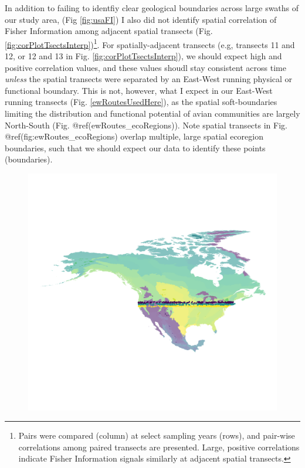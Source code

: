 \documentclass[12pt,twoside,openany]{reedthesis}
\begin{document}
In addition to failing to identfiy clear geological boundaries across large swaths of our study area, (Fig \ref{fig:usaFI}) I also did not identify spatial correlation of Fisher Information among adjacent spatial transects (Fig. \ref{fig:corPlotTsectsInterp})\footnote{Pairs were compared (column) at select sampling years (rows), and pair-wise correlations among paired transects are presented. Large, positive correlations indicate Fisher Information signals similarly at adjacent spatial transects.}. For spatially-adjacent transects (e.g, transects 11 and 12, or 12 and 13 in Fig. \ref{fig:corPlotTsectsInterp}), we should expect high and positive correlation values, and these values shoudl stay consistent across time \emph{unless} the spatial transects were separated by an East-West running physical or functional boundary. This is not, however, what I expect in our East-West running transects (Fig. \ref{ewRoutesUsedHere}), as the spatial soft-boundaries limiting the distribution and functional potential of avian communities are largely North-South (Fig. @ref(ewRoutes\_ecoRegions)). Note spatial transects in Fig. @ref(fig:ewRoutes\_ecoRegions) overlap multiple, large spatial ecoregion boundaries, such that we should expect our data to identify these points (boundaries).
\begin{figure}
\includegraphics[width=0.75\linewidth]{./chapterFiles/fisherSpatial/figures/figsCalledInDiss/allRoutesUsed_ecoregions} \end{figure}
\end{document}
